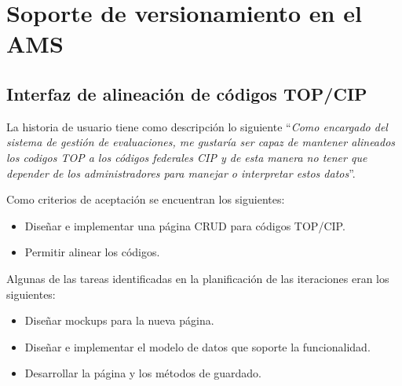 \section{Soporte de versionamiento en el AMS}
\begin{table}[H]
\centering
\caption{Historias de usuario para soporte de versionamiento en el AMS}
\label{epic:10}
\end{table}

\subsection{Interfaz de alineación de códigos TOP/CIP}
La historia de usuario tiene como descripción lo siguiente \enquote{\textit{Como encargado del sistema de gestión de evaluaciones, me gustaría ser capaz de mantener alineados los codigos TOP a los códigos federales CIP y de esta manera no tener que depender de los administradores para manejar o interpretar estos datos}}.

Como criterios de aceptación se encuentran los siguientes:
\begin{itemize}
	\item Diseñar e implementar una página CRUD para códigos TOP/CIP.
	\item Permitir alinear los códigos.
\end{itemize}

Algunas de las tareas identificadas en la planificación de las iteraciones eran los siguientes:
\begin{itemize}
	\item Diseñar mockups para la nueva página.
	\item Diseñar e implementar el modelo de datos que soporte la funcionalidad.
	\item Desarrollar la página y los métodos de guardado.
\end{itemize}

